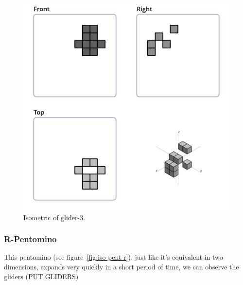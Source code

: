 \begin{figure}
  \centering
  \includegraphics[scale=0.3]{iso_settings/glider_3.png}
  \caption{Isometric of glider-3.}
  \label{fig:iso-glider-3}
\end{figure}

\subsubsection{R-Pentomino}
This pentomino (see figure~\ref{fig:iso-pent-r}), just like it's equivalent in
two dimensions, expands very quickly in a short period of time, we can observe
the gliders (PUT GLIDERS)

